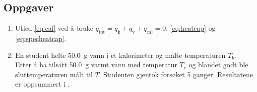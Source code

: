 	\subsection{Oppgaver}
	\begin{enumerate}[label=\alph*)]
		\item Utled \cref{eq:cal} ved å bruke $q_\mathrm{tot}=q_\mathrm{k} + q_\mathrm{v} + q_\mathrm{cal} = 0$, \cref{eq:heatcap} og \cref{eq:specheatcap}.
		
		\item En student helte \SI{50.0}{g} vann i et kalorimeter og målte temperaturen $T_\mathrm{k}$.
		Etter å ha tilsatt \SI{50.0}{g} varmt vann med temperatur $T_\mathrm{v}$ og blandet godt ble sluttemperaturen målt til $T$.
		Studenten gjentok forsøket 5 ganger.
		Resultatene er oppsummert i .
		

\end{enumerate}
